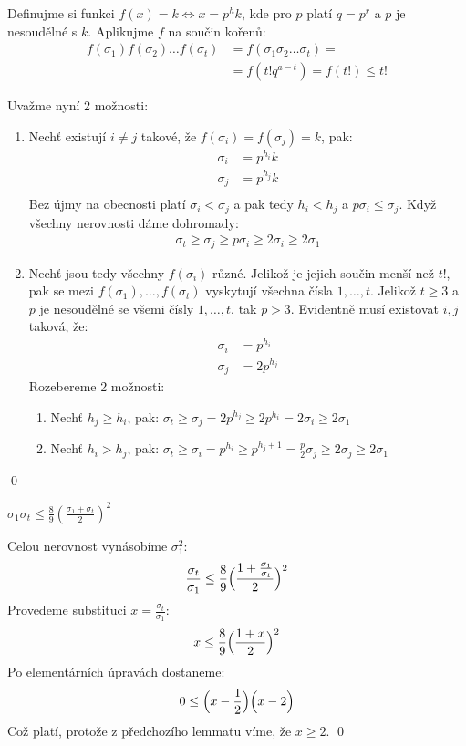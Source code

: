 \dk Definujme si funkci $f(x) = k \Leftrightarrow x = p^hk$, kde pro $p$ platí $q = p^r$ a $p$ je nesoudělné s $k$. Aplikujme $f$ na součin kořenů:
\begin{align*}
f(\sigma_1)f(\sigma_2) \dots f(\sigma_t) &= f(\sigma_1\sigma_2 \dots \sigma_t) =\\
&= f(t!q^{a-t}) = f(t!) \leq t!
\end{align*}

Uvažme nyní 2 možnosti:
\begin{enumerate}
\item Nechť existují $i \neq j$ takové, že $f(\sigma_i) = f(\sigma_j) = k$, pak:
\begin{align*}
\sigma_i &= p^{h_i}k \\
\sigma_j &= p^{h_j}k \\
\end{align*}
Bez újmy na obecnosti platí $\sigma_i < \sigma_j$ a pak tedy $h_i < h_j$ a $p\sigma_i \leq \sigma_j$. Když všechny nerovnosti dáme dohromady:
\begin{align*}
\sigma_t \geq \sigma_j \geq p\sigma_i \geq 2\sigma_i \geq 2\sigma_1
\end{align*}
\item Nechť jsou tedy všechny $f(\sigma_i)$ různé. Jelikož je jejich součin menší než $t!$, pak se mezi $f(\sigma_1),\dots ,f(\sigma_t)$ vyskytují všechna čísla $1,\dots,t$. Jelikož $t \geq 3$ a $p$ je nesoudělné se všemi čísly $1,\dots,t$, tak $p > 3$. Evidentně musí existovat $i,j$ taková, že:
\begin{align*}
\sigma_i &= p^{h_i} \\
\sigma_j &= 2p^{h_j}
\end{align*}
Rozebereme 2 možnosti:
\begin{enumerate}
\item Nechť $h_j \geq h_i$, pak: $\sigma_t \geq \sigma_j = 2p^{h_j} \geq 2p^{h_i} = 2\sigma_i \geq 2\sigma_1$
\item Nechť $h_i > h_j$, pak: $\sigma_t \geq \sigma_i = p^{h_i} \geq p^{h_j + 1} = \frac{p}{2}\sigma_j \geq 2\sigma_j \geq 2\sigma_1$
\end{enumerate}
\end{enumerate}
\qed

\lm $\sigma_1\sigma_t \leq \frac{8}{9}(\frac{\sigma_1 + \sigma_t}{2})^2$

\dk Celou nerovnost vynásobíme $\sigma^2_1$:
\begin{align*}
\frac{\sigma_t}{\sigma_1} \leq \frac{8}{9}\Bigl(\frac{1 + \frac{\sigma_1}{\sigma_t}}{2}\Bigr)^2
\end{align*}
Provedeme substituci $x = \frac{\sigma_t}{\sigma_1}$:
\begin{align*}
x \leq \frac{8}{9}\Bigl(\frac{1 + x}{2}\Bigr)^2
\end{align*}
Po elementárních úpravách dostaneme:
\begin{align*}
0 \leq \Bigl(x - \frac{1}{2}\Bigr)\Bigl(x - 2\Bigr)
\end{align*}
Což platí, protože z předchozího lemmatu víme, že $x \geq 2$. \qed



